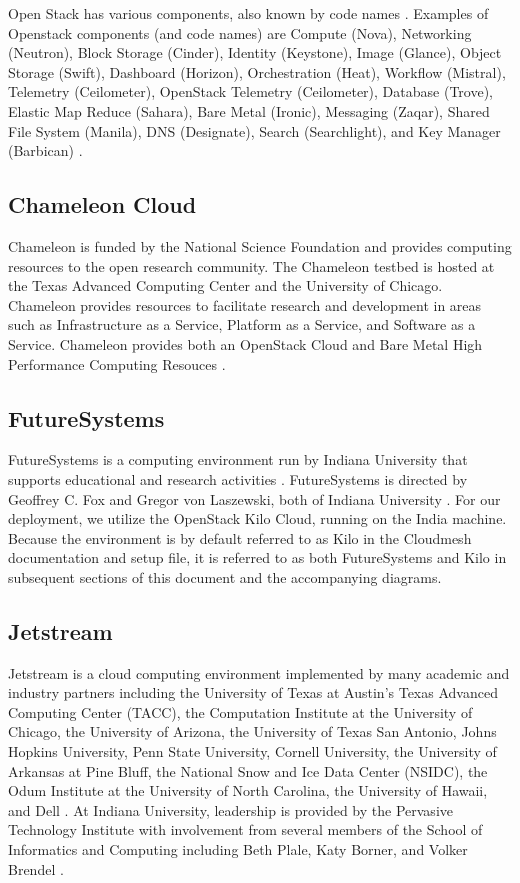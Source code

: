 \documentclass[9pt,twocolumn,twoside]{../../styles/osajnl}
\begin{document}
Open Stack has various components, also known by code names \cite{www-wikiOpenStack}.  Examples of Openstack components (and code names) are Compute (Nova), Networking (Neutron), Block Storage (Cinder), Identity (Keystone), Image (Glance), Object Storage (Swift), Dashboard (Horizon), Orchestration (Heat), Workflow (Mistral), Telemetry (Ceilometer), OpenStack Telemetry (Ceilometer), Database (Trove), Elastic Map Reduce (Sahara), Bare Metal (Ironic), Messaging (Zaqar), Shared File System (Manila), DNS (Designate), Search (Searchlight), and Key Manager (Barbican) \cite{www-wikiOpenStack}.

\subsection{Chameleon Cloud}

Chameleon is funded by the National Science Foundation and provides computing resources to the open research community.  The Chameleon testbed is hosted at the Texas Advanced Computing Center and the University of Chicago. Chameleon provides resources to facilitate research and development in areas such as Infrastructure as a Service, Platform as a Service, and Software as a Service.  Chameleon provides both an OpenStack Cloud and Bare Metal High Performance Computing Resouces \cite{www-chamAbout}.


\subsection{FutureSystems}

FutureSystems is a computing environment run by Indiana University that supports educational and research activities \cite{www-futureSystems}. FutureSystems is directed by Geoffrey C. Fox and Gregor von Laszewski, both of Indiana University \cite{www-fsAbout}.  For our deployment, we utilize the OpenStack Kilo Cloud, running on the India machine.  Because the environment is by default referred to as Kilo in the Cloudmesh documentation and setup file, it is referred to as both FutureSystems and Kilo in subsequent sections of this document and the accompanying diagrams.


\subsection{Jetstream}

Jetstream is a cloud computing environment implemented by many academic and industry partners including the University of Texas at Austin's Texas Advanced Computing Center (TACC), the Computation Institute at the University of Chicago, the University of Arizona, the University of Texas San Antonio, Johns Hopkins University, Penn State University, Cornell University, the University of Arkansas at Pine Bluff, the National Snow and Ice Data Center (NSIDC), the Odum Institute at the University of North Carolina, the University of Hawaii, and Dell \cite{www-jetstream1}.  At Indiana University, leadership is provided by the Pervasive Technology Institute with involvement from several members of the  School of Informatics and Computing including Beth Plale, Katy Borner, and Volker Brendel \cite{www-jetstream2}.
\end{document}
